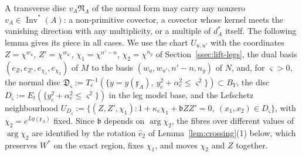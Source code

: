 A transverse disc $v_A\mathfrak N_A$ of the normal form may carry any nonzero $v_A\in\operatorname{Inv}^*(A)$: a
non-primitive covector, a covector whose kernel meets the vanishing direction with any multiplicity, or a multiple of
$d^*_A$ itself. The following lemma gives its piece in all cases. We use the chart $U_{u,u'}$ with the coordinates
$Z=\chi^{w_u}$, $Z'=\chi^{w_{u'}}$, $\chi_1=\chi^{n'-n}$, $\chi_2=\chi^{n_y}$ of Section~\ref{ssec:lift-legs}, the dual basis
$(e_Z,e_{Z'},e_{\chi_1},e_{\chi_2})$ of $M$ to the basis $(w_u,w_{u'},n'-n,n_y)$ of $N$, and, for $\varsigma>0$, the normal
disc $\mathfrak D_\varsigma:=T_e^{-1}(\{y=y(\mathfrak x_A),\ y_e^2+\alpha_e^2\le\varsigma^2\})\subset B_Y$, the disc
$D_\varsigma:=E_t(\{y_e^2+\alpha_e^2\le\varsigma^2\})$ in the leg model base, and the Lefschetz neighbourhood
$U_{D_\varsigma}:=\{(Z,Z',\chi_1):1+\kappa_e\chi_1+\mathfrak bZZ'=0,\ (x_1,x_2)\in D_\varsigma\}$, with
$\chi_2=e^{Ly(\mathfrak x_A)}$ fixed. Since $\mathfrak b$ depends on $\arg\chi_2$, the fibres over different values of
$\arg\chi_2$ are identified by the rotation $\hat e_2$ of Lemma~\ref{lem:crossing}(1) below, which preserves $W^*$ on the exact region, fixes $\chi_1$,
and moves $\chi_2$ and $Z$ together.

